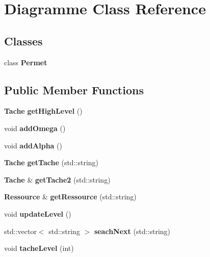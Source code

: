 \section{Diagramme Class Reference}
\label{class_diagramme}
\subsection*{Classes}
\begin{DoxyCompactItemize}
\item 
class {\bf Permet}
\end{DoxyCompactItemize}
\subsection*{Public Member Functions}
\begin{DoxyCompactItemize}
\item 
{\bf Tache} {\bfseries get\-High\-Level} ()\label{class_diagramme_abc5f0a52dda91000a1eafbee0c674553}

\item 
void {\bfseries add\-Omega} ()\label{class_diagramme_a3e3b871910fe333b9559037cd0bc08fb}

\item 
void {\bfseries add\-Alpha} ()\label{class_diagramme_a569ec9824d96bdd6f2443af7abaf6b2f}

\item 
{\bf Tache} {\bfseries get\-Tache} (std\-::string)\label{class_diagramme_aca5e3890ae1af3b605cbb97ba1382b93}

\item 
{\bf Tache} \& {\bfseries get\-Tache2} (std\-::string)\label{class_diagramme_a8977550a143faba7674b2ecfa5db8b52}

\item 
{\bf Ressource} \& {\bfseries get\-Ressource} (std\-::string)\label{class_diagramme_a22233da6e71618a7be98129aa36570b3}

\item 
void {\bfseries update\-Level} ()\label{class_diagramme_a7c4b109cb9af31583b4bec69d352d40e}

\item 
std\-::vector$<$ std\-::string $>$ {\bfseries seach\-Next} (std\-::string)\label{class_diagramme_ad59965f4bfd0d8f8ec3cd0fd97f318bd}

\item 
void {\bfseries tache\-Level} (int)\label{class_diagramme_aef8de8aed4be262c8bd4a7aaae98992e}


\end{DoxyCompactItemize}
